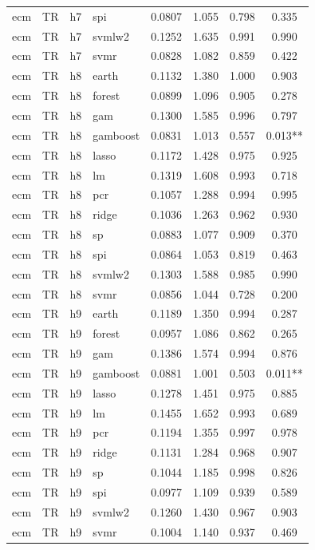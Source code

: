 \begin{ThreePartTable}
\begin{longtable}[t]{llclcccc}
ecm & TR & h7 & spi & 0.0807 & 1.055 & 0.798 & 0.335\\
ecm & TR & h7 & svmlw2 & 0.1252 & 1.635 & 0.991 & 0.990\\
ecm & TR & h7 & svmr & 0.0828 & 1.082 & 0.859 & 0.422\\
\addlinespace
ecm & TR & h8 & earth & 0.1132 & 1.380 & 1.000 & 0.903\\
ecm & TR & h8 & forest & 0.0899 & 1.096 & 0.905 & 0.278\\
ecm & TR & h8 & gam & 0.1300 & 1.585 & 0.996 & 0.797\\
ecm & TR & h8 & gamboost & 0.0831 & 1.013 & 0.557 & 0.013**\\
ecm & TR & h8 & lasso & 0.1172 & 1.428 & 0.975 & 0.925\\
ecm & TR & h8 & lm & 0.1319 & 1.608 & 0.993 & 0.718\\
ecm & TR & h8 & pcr & 0.1057 & 1.288 & 0.994 & 0.995\\
ecm & TR & h8 & ridge & 0.1036 & 1.263 & 0.962 & 0.930\\
ecm & TR & h8 & sp & 0.0883 & 1.077 & 0.909 & 0.370\\
ecm & TR & h8 & spi & 0.0864 & 1.053 & 0.819 & 0.463\\
ecm & TR & h8 & svmlw2 & 0.1303 & 1.588 & 0.985 & 0.990\\
ecm & TR & h8 & svmr & 0.0856 & 1.044 & 0.728 & 0.200\\
\addlinespace
ecm & TR & h9 & earth & 0.1189 & 1.350 & 0.994 & 0.287\\
ecm & TR & h9 & forest & 0.0957 & 1.086 & 0.862 & 0.265\\
ecm & TR & h9 & gam & 0.1386 & 1.574 & 0.994 & 0.876\\
ecm & TR & h9 & gamboost & 0.0881 & 1.001 & 0.503 & 0.011**\\
ecm & TR & h9 & lasso & 0.1278 & 1.451 & 0.975 & 0.885\\
ecm & TR & h9 & lm & 0.1455 & 1.652 & 0.993 & 0.689\\
ecm & TR & h9 & pcr & 0.1194 & 1.355 & 0.997 & 0.978\\
ecm & TR & h9 & ridge & 0.1131 & 1.284 & 0.968 & 0.907\\
ecm & TR & h9 & sp & 0.1044 & 1.185 & 0.998 & 0.826\\
ecm & TR & h9 & spi & 0.0977 & 1.109 & 0.939 & 0.589\\
ecm & TR & h9 & svmlw2 & 0.1260 & 1.430 & 0.967 & 0.903\\
ecm & TR & h9 & svmr & 0.1004 & 1.140 & 0.937 & 0.469\\

\end{longtable}
\end{ThreePartTable}
